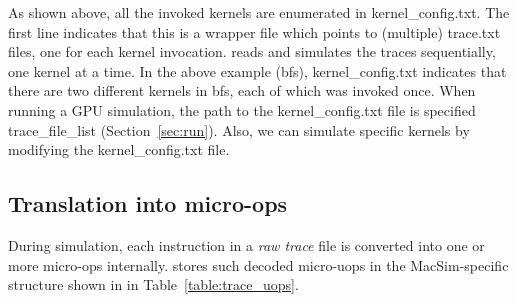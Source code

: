 As shown above, all the invoked kernels are enumerated in kernel\_config.txt.
The first line indicates that this is a wrapper file which points to (multiple)
  trace.txt files, one for each kernel invocation. \SIM reads and simulates the
  traces sequentially, one kernel at a time.  In the above example (bfs),
  kernel\_config.txt indicates that there are two different kernels in bfs,
  each of which was invoked once. When running a GPU simulation, the path to
  the kernel\_config.txt file is specified trace\_file\_list
  (Section~\ref{sec:run}).  Also, we can simulate specific kernels
  by modifying the kernel\_config.txt file.

\subsection{Translation into micro-ops}

During simulation, each instruction in a \emph{raw trace} file is
converted into one or more micro-ops internally. \SIM stores such
decoded micro-uops in the MacSim-specific structure shown in in
Table~\ref{table:trace_uops}.

